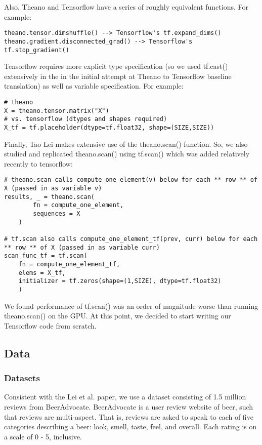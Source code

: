 \documentclass{article} %
\begin{document}
Also, Theano and Tensorflow have a series of roughly equivalent functions.  For example:
\begin{verbatim}
theano.tensor.dimshuffle() --> Tensorflow's tf.expand_dims()
theano.gradient.disconnected_grad() --> Tensorflow's tf.stop_gradient() 
\end{verbatim}

Tensorflow requires more explicit type specification (so we used tf.cast() extensively in the in the initial attempt at Theano to Tensorflow baseline translation) as well as variable specification.  For example:

\begin{verbatim}
# theano
X = theano.tensor.matrix("X")
# vs. tensorflow (dtypes and shapes required)
X_tf = tf.placeholder(dtype=tf.float32, shape=(SIZE,SIZE))
\end{verbatim}

Finally, Tao Lei makes extensive use of the theano.scan() function.  So, we also studied and replicated theano.scan() using tf.scan() which was added relatively recently to tensorflow:
\begin{verbatim}
# theano.scan calls compute_one_element(v) below for each ** row ** of X (passed in as variable v)
results, _ = theano.scan(
		fn = compute_one_element,
		sequences = X
	)

# tf.scan also calls compute_one_element_tf(prev, curr) below for each ** row ** of X (passed in as variable curr)
scan_func_tf = tf.scan(
	fn = compute_one_element_tf,
	elems = X_tf,
	initializer = tf.zeros(shape=(1,SIZE), dtype=tf.float32)
	)
\end{verbatim}

We found performance of tf.scan() was an order of magnitude worse than running theano.scan() on the GPU.  At this point, we decided to start writing our Tensorflow code from scratch.

\subsection{Data}

\subsubsection{Datasets}

Consistent with the Lei et al. paper, we use a dataset consisting of 1.5 million
reviews from BeerAdvocate. BeerAdvocate is a user review website of beer, such
that reviews are multi-aspect. That is, reviews are asked to speak to each of
five categories describing a beer: look, smell, taste, feel, and overall. Each
rating is on a scale of 0 - 5, inclusive.
\end{document}
